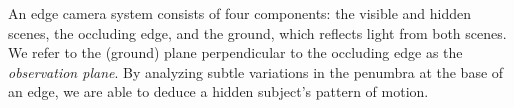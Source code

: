 \def\vekSp@lten#1{\xvekSp@lten#1;vekL@stLine;}
\def\vekL@stLine{vekL@stLine}
\def\xvekSp@lten#1;{\def\temp{#1}%
	\ifx\temp\vekL@stLine
	\else
	\ifnum\@VORNE=1\gdef\@VORNE{0}
	\else\@arraycr\fi%
	#1%
	\expandafter\xvekSp@lten
	\fi}
\makeatother

An edge camera system consists of four components: the visible and hidden scenes, the occluding edge,
and the ground, which reflects light from both scenes. We refer to the (ground) plane perpendicular to the occluding edge as the {\it observation plane}.
By analyzing subtle variations in the penumbra at the base of an edge, we are able to deduce a hidden subject's pattern of motion.

